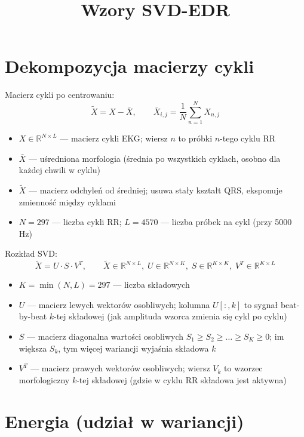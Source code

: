 \documentclass[12pt]{article}
\title{Wzory SVD-EDR}
\date{}
\begin{document}
\maketitle

\section*{Dekompozycja macierzy cykli}

Macierz cykli po centrowaniu:
\[
  \tilde{X} = X - \bar{X},
  \qquad \bar{X}_{i,j} = \frac{1}{N}\sum_{n=1}^{N} X_{n,j}
\]

\begin{itemize}
  \item $X \in \mathbb{R}^{N \times L}$ — macierz cykli EKG; wiersz $n$ to próbki $n$-tego cyklu RR
  \item $\bar{X}$ — uśredniona morfologia (średnia po wszystkich cyklach, osobno dla każdej chwili w cyklu)
  \item $\tilde{X}$ — macierz odchyleń od średniej; usuwa stały kształt QRS, eksponuje zmienność między cyklami
  \item $N = 297$ — liczba cykli RR; $L = 4570$ — liczba próbek na cykl (przy 5000 Hz)
\end{itemize}

Rozkład SVD:
\[
  \tilde{X} = U \cdot S \cdot V^{T},
  \qquad
  \tilde{X} \in \mathbb{R}^{N \times L},\;
  U \in \mathbb{R}^{N \times K},\;
  S \in \mathbb{R}^{K \times K},\;
  V^{T} \in \mathbb{R}^{K \times L}
\]

\begin{itemize}
  \item $K = \min(N, L) = 297$ — liczba składowych
  \item $U$ — macierz lewych wektorów osobliwych; kolumna $U[:,k]$ to sygnał beat-by-beat $k$-tej składowej (jak amplituda wzorca zmienia się cykl po cyklu)
  \item $S$ — macierz diagonalna wartości osobliwych $S_1 \geq S_2 \geq \ldots \geq S_K \geq 0$; im większa $S_k$, tym więcej wariancji wyjaśnia składowa $k$
  \item $V^T$ — macierz prawych wektorów osobliwych; wiersz $V_k$ to wzorzec morfologiczny $k$-tej składowej (gdzie w cyklu RR składowa jest aktywna)
\end{itemize}

\section*{Energia (udział w wariancji)}
\end{document}
